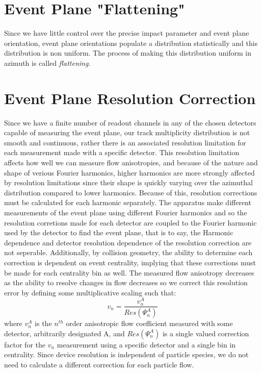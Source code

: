 \section{Event Plane "Flattening"}
Since we have little control over the precise impact parameter and event plane orientation, event plane orientations populate a distribution statistically and this distribution is non uniform. The process of making this distribution uniform in azimuth is called \textit{flattening}.
\section{Event Plane Resolution Correction}
Since we have a finite number of readout channels in any of the chosen detectors capable of measuring the event plane, our track multiplicity distribution is not smooth and continuous, rather there is an associated resolution limitation for each measurement made with a specific detector. This resolution limitation affects how well we can measure flow anisotropies, and because of the nature and shape of verious Fourier harmonics, higher harmonics are more strongly affected by resolution limitations since their shape is quickly varying over the azimuthal distribution compared to lower harmonics. Because of this, resolution corrections must be calculated for each harmonic separately. The apparatus make different measurements of the event plane using different Fourier harmonics and so the resolution corretions made for each detector are coupled to the Fourier harmonic used by the detector to find the event plane, that is to say, the Harmonic dependence and detector resolution dependence of the resolution correction are not seperable. Additionally, by collision geometry, the ability to determine each correction is dependent on event centrality, implying that these corrections must be made for each centrality bin as well. The measured flow anisotropy decreases as the ability to resolve changes in flow decreases so we correct this resolution error by defining some multiplicative scaling such that:
\begin{equation}
v_n = \frac{v_n^{A}}{Res(\Psi_n^A)}
\end{equation}
where $v_n^{A}$ is the $n^{th}$ order anisotropic flow coefficient measured with some detector, arbitrarily designated A, and $Res(\Psi_n^A)$ is a single valued correction factor for the $v_n$ measurement using a specific detector and a single bin in centrality. Since device resolution is independent of particle species, we do not need to calculate a different correction for each particle flow. 

